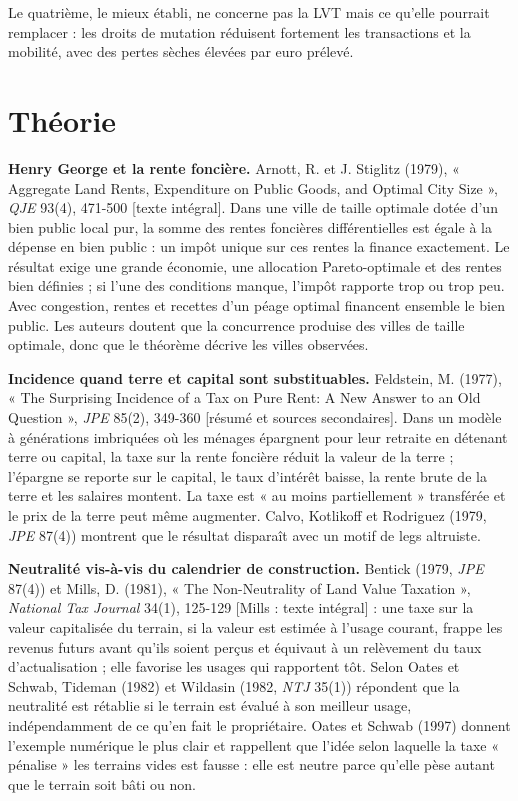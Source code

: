 \documentclass[11pt,a4paper]{article}
\newcommand{\lu}[1]{{\footnotesize\color{ocre}[#1]}}
\begin{document}
Le quatrième, le mieux établi, ne concerne pas la LVT mais ce qu'elle pourrait remplacer : les
droits de mutation réduisent fortement les transactions et la mobilité, avec des pertes sèches
élevées par euro prélevé.

\section{Théorie}

\textbf{Henry George et la rente foncière.} Arnott, R. et J. Stiglitz (1979), « Aggregate Land
Rents, Expenditure on Public Goods, and Optimal City Size », \emph{QJE} 93(4), 471-500
\lu{texte intégral}. Dans une ville de taille optimale dotée d'un bien public local pur, la somme
des rentes foncières différentielles est égale à la dépense en bien public : un impôt unique sur
ces rentes la finance exactement. Le résultat exige une grande économie, une allocation
Pareto-optimale et des rentes bien définies ; si l'une des conditions manque, l'impôt rapporte
trop ou trop peu. Avec congestion, rentes et recettes d'un péage optimal financent ensemble le bien
public. Les auteurs doutent que la concurrence produise des villes de taille optimale, donc que le
théorème décrive les villes observées.

\textbf{Incidence quand terre et capital sont substituables.} Feldstein, M. (1977), « The
Surprising Incidence of a Tax on Pure Rent: A New Answer to an Old Question », \emph{JPE} 85(2),
349-360 \lu{résumé et sources secondaires}. Dans un modèle à générations imbriquées où les ménages
épargnent pour leur retraite en détenant terre ou capital, la taxe sur la rente foncière réduit la
valeur de la terre ; l'épargne se reporte sur le capital, le taux d'intérêt baisse, la rente brute
de la terre et les salaires montent. La taxe est « au moins partiellement » transférée et le prix
de la terre peut même augmenter. Calvo, Kotlikoff et Rodriguez (1979, \emph{JPE} 87(4)) montrent
que le résultat disparaît avec un motif de legs altruiste.

\textbf{Neutralité vis-à-vis du calendrier de construction.} Bentick (1979, \emph{JPE} 87(4)) et
Mills, D. (1981), « The Non-Neutrality of Land Value Taxation », \emph{National Tax Journal} 34(1),
125-129 \lu{Mills : texte intégral} : une taxe sur la valeur capitalisée du terrain, si la valeur
est estimée à l'usage courant, frappe les revenus futurs avant qu'ils soient perçus et équivaut à
un relèvement du taux d'actualisation ; elle favorise les usages qui rapportent tôt. Selon Oates et Schwab, Tideman
(1982) et Wildasin (1982, \emph{NTJ} 35(1)) répondent que la neutralité est rétablie si le terrain
est évalué à son meilleur usage, indépendamment de ce qu'en fait le propriétaire. Oates et Schwab
(1997) donnent l'exemple numérique le plus clair et rappellent que l'idée selon laquelle la taxe
« pénalise » les terrains vides est fausse : elle est neutre parce qu'elle pèse autant que le
terrain soit bâti ou non.
\end{document}
